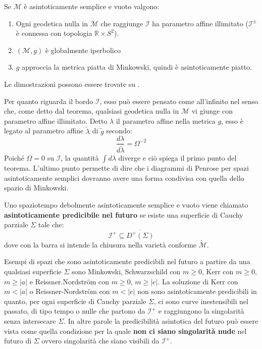 \begin{teorema}
Se $\mathcal{M}$ è asintoticamente semplice e vuoto valgono:
\begin{enumerate}
    \item Ogni geodetica nulla in $\mathcal{M}$ che raggiunge $\mathcal{I}$ ha parametro affine illimitato ($\mathcal{I}^\pm$ è connessa con topologia $\mathbb{R}\times S^2$).
    \item $(\mathcal{M},g)$ è globalmente iperbolico
    \item $g$ approccia la metrica piatta di Minkowski, quindi è asintoticamente piatto.
\end{enumerate}
\end{teorema}
Le dimostrazioni possono essere trovate su \cite{hawking}. 

Per quanto riguarda il bordo $\mathcal{I}$, esso può essere pensato come all'infinito nel senso che, come detto dal teorema, qualsiasi geodetica nulla in $\mathcal{M}$ vi giunge con parametro affine illimitato. Detto $\lambda$ il parametro affine nella metrica $g$, esso è legato al parametro affine $\tilde{\lambda}$ di $\tilde{g}$ secondo:
\begin{equation*}
    \frac{d\lambda}{d\tilde{\lambda}}= \Omega^{-2}
\end{equation*}
Poiché $\Omega=0$ su $\mathcal{I}$, la quantità $\int d\lambda$ diverge e ciò spiega il primo punto del teorema. L'ultimo punto permette di dire che i diagrammi di Penrose per spazi asintoticamente semplici dovranno avere una forma condivisa con quella dello spazio di Minkowski.

\begin{definizione}
    Uno spaziotempo debolmente asintoticamente semplice e vuoto viene chiamato \textbf{asintoticamente predicibile nel futuro} se esiste una superficie di Cauchy parziale $\Sigma$ tale che:
\begin{equation*}
        \mathcal{I}^+ \subseteq \overline{D^+(\Sigma)}
\end{equation*}
dove con la barra si intende la chiusura nella varietà conforme $\tilde{\mathcal{M}}$.
\end{definizione}
Esempi di spazi che sono asintoticamente predicibili nel futuro a partire da una qualsiasi superficie $\Sigma$ sono Minkowski, Schwarzschild con $m\geq 0$, Kerr con $m\geq 0$, $m\geq |a|$ e Reissner.Nordstr\"om con $m\geq 0$, $m \geq |e|$.  La soluzione di Kerr con $m < |a|$ o Reissner-Nordstr\"om con $m < |e|$ non sono asintoticamente predicibili in quanto, per ogni superficie di Cauchy parziale $\Sigma$, ci sono curve inestensibili nel passato, di tipo tempo o nulle che partono da $\mathcal{I}^+$ e raggiungono la singolarità senza intersecare $\Sigma$. In altre parole la predicibilità asintotica del futuro può essere vista come quella condizione per la quale \textbf{non ci siano singolarità nude} nel futuro di $\Sigma$ ovvero singolarità che siano visibili da $\mathcal{I}^+$.

